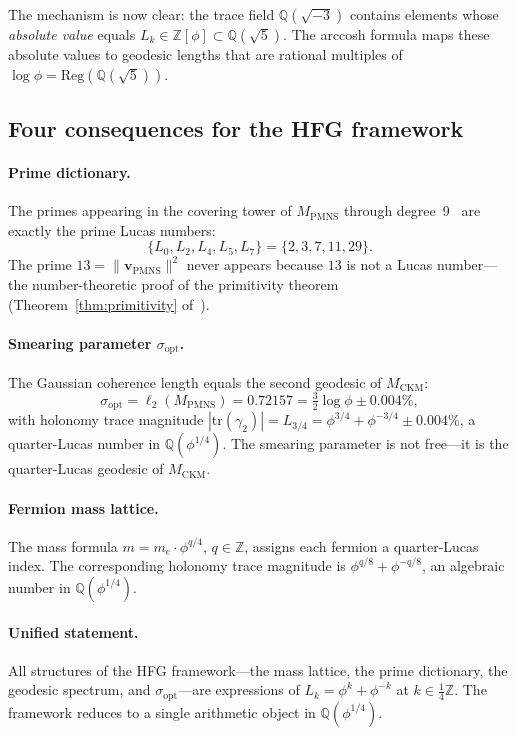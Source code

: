 ﻿\documentclass[12pt]{article}
\theoremstyle{definition}
\begin{document}
\medskip
The mechanism is now clear: the trace field $\mathbb{Q}(\sqrt{-3})$
contains elements whose \emph{absolute value} equals $L_k \in
\mathbb{Z}[\phi] \subset \mathbb{Q}(\sqrt{5})$. The arccosh formula
maps these absolute values to geodesic lengths that are rational
multiples of $\log\phi = \mathrm{Reg}(\mathbb{Q}(\sqrt{5}))$.

\subsection*{Four consequences for the HFG framework}

\paragraph{Prime dictionary.}
The primes appearing in the covering tower of $M_\mathrm{PMNS}$
through degree~9~\cite{Gentry:Covering} are exactly the prime Lucas
numbers:
\[
  \{L_0, L_2, L_4, L_5, L_7\} = \{2, 3, 7, 11, 29\}.
\]
The prime $13 = \|\mathbf{v}_\mathrm{PMNS}\|^2$ never appears because
$13$ is not a Lucas number---the number-theoretic proof of the
primitivity theorem (Theorem~\ref{thm:primitivity} of~\cite{Gentry:Covering}).

\paragraph{Smearing parameter $\sigma_\mathrm{opt}$.}
The Gaussian coherence length equals the second geodesic of $M_\mathrm{CKM}$:
\[
  \sigma_\mathrm{opt} = \ell_2(M_\mathrm{PMNS}) = 0.72157
  = \tfrac{3}{2}\log\phi \pm 0.004\%,
\]
with holonomy trace magnitude $|\mathrm{tr}(\gamma_2)| = L_{3/4} = \phi^{3/4}+\phi^{-3/4} \pm 0.004\%$, a quarter-Lucas number in
$\mathbb{Q}(\phi^{1/4})$. The smearing parameter is not free---it is
the quarter-Lucas geodesic of $M_\mathrm{CKM}$.

\paragraph{Fermion mass lattice.}
The mass formula $m = m_e\cdot\phi^{q/4}$, $q\in\mathbb{Z}$,
assigns each fermion a quarter-Lucas index. The corresponding
holonomy trace magnitude is $\phi^{q/8}+\phi^{-q/8}$, an algebraic
number in $\mathbb{Q}(\phi^{1/4})$.

\paragraph{Unified statement.}
All structures of the HFG framework---the mass lattice, the prime
dictionary, the geodesic spectrum, and $\sigma_\mathrm{opt}$---are
expressions of $L_k = \phi^k+\phi^{-k}$ at $k\in\tfrac{1}{4}\mathbb{Z}$.
The framework reduces to a single arithmetic object in $\mathbb{Q}(\phi^{1/4})$.
\end{document}

